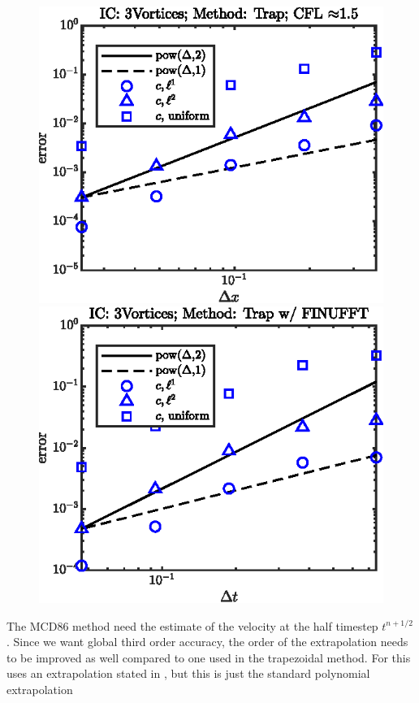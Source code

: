 \documentclass[11pt,letterpaper]{article}
\begin{document}
\begin{figure}[H]
    \includegraphics{figs/nonlin_conv_order_3Vortices_Trap}
    \includegraphics{figs/nonlin_conv_order_3Vortices_finu_Trap}
    \caption{}\label{fig:nonlin_conv_order_Taylor_Trap}
\end{figure}
The MCD86 method need the estimate of the velocity at the half timestep $t^{n+1/2}$. Since we want global third order accuracy, the order of the extrapolation needs to be improved as well compared to one used in the trapezoidal method. For this \cite{mcdonald1987} uses an extrapolation stated in \cite{temperton1987}, but this is just the standard polynomial extrapolation
\end{document}
